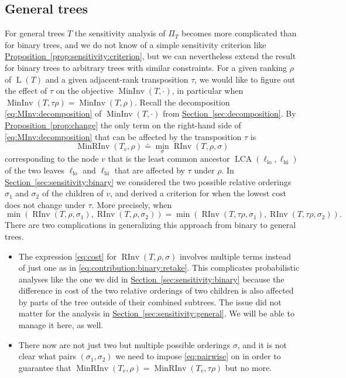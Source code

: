 \documentclass[11pt]{article}
\numberwithin{equation}{section}
\theoremstyle{definition}
\theoremstyle{plain}
\newcommand{\expref}[2]{\hyperref[#2]{#1~\ref{#2}}}
\DeclareMathOperator{\LCA}{LCA}
\DeclareMathOperator{\leafset}{L}
\newcommand{\ranking}{\rho}
\newcommand{\ordering}{\sigma}
\newcommand{\transposition}{\tau}
\DeclareMathOperator{\MInv}{MinInv}
\DeclareMathOperator{\MRInv}{MinRInv}
\DeclareMathOperator{\RInv}{RInv}
\newcommand{\lo}{\mathrm{lo}}
\newcommand{\hi}{\mathrm{hi}}
\begin{document}
\subsection{General trees}
\label{sec:connectivity:general}

For general trees $T$ the sensitivity analysis of $\Pi_T$ becomes more complicated than for binary trees, and we do not know of a simple sensitivity criterion like \expref{Proposition}{prop:sensitivity:criterion}, but we can nevertheless extend the result for binary trees to arbitrary trees with similar constraints. 
For a given ranking $\ranking$ of $\leafset(T)$ and a given adjacent-rank transposition $\transposition$, we would like to figure out the effect of $\transposition$ on the objective $\MInv(T,\cdot)$, in particular when $\MInv(T,\transposition \ranking) = \MInv(T,\ranking)$. Recall the decomposition \eqref{eq:MInv:decomposition} of $\MInv(T,\cdot)$ from \expref{Section}{sec:decomposition}. By \expref{Proposition}{prop:change} the only term on the right-hand side of \eqref{eq:MInv:decomposition} that can be affected by the transposition $\transposition$ is
\[ \MRInv(T_v,\ranking) \doteq \min_\ordering \RInv(T,\ranking,\ordering) \]
corresponding to the node $v$ that is the least common ancestor $\LCA(\ell_\lo,\ell_\hi)$ of the two leaves $\ell_\lo$ and $\ell_\hi$ that are affected by $\transposition$ under $\ranking$. In \expref{Section}{sec:sensitivity:binary} we considered the two possible relative orderings $\ordering_1$ and $\ordering_2$ of the children of $v$, and derived a criterion for when the lowest cost does not change under $\transposition$. More precisely, when 
\begin{equation}\label{eq:pairwise}
\min(\RInv(T,\ranking,\ordering_1), \RInv(T,\ranking,\ordering_2)) = \min(\RInv(T,\transposition \ranking,\ordering_1), \RInv(T,\transposition \ranking,\ordering_2)). 
\end{equation}
There are two complications in generalizing this approach from binary to general trees.
\begin{itemize}
\item 
The expression \eqref{eq:cost} for $\RInv(T,\ranking,\ordering)$ involves multiple terms instead of just one as in \eqref{eq:contribution:binary:retake}. This complicates probabilistic analyses like the one we did in \expref{Section}{sec:sensitivity:binary} because the difference in cost of the two relative orderings of two children is also affected by parts of the tree outside of their combined subtrees. The issue did not 
matter for the analysis in \expref{Section}{sec:sensitivity:general}. We will be able to manage it here, as well.
\item There now are not just two but multiple possible orderings $\ordering$, and it is not clear what pairs $(\ordering_1,\ordering_2)$ we need to impose \eqref{eq:pairwise} on in order to guarantee that $\MRInv(T_v,\ranking) = \MRInv(T_v,\transposition \ranking)$ but no more.
\end{itemize}
\end{document}
